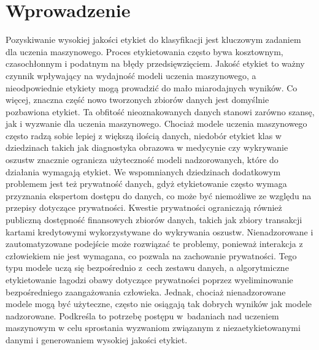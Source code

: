 \documentclass [runningheads]{llncs}
\begin{document}
\section*{Wprowadzenie}
Pozyskiwanie wysokiej jakości etykiet do klasyfikacji jest kluczowym zadaniem dla uczenia maszynowego.
Proces etykietowania często bywa kosztownym, czasochłonnym i podatnym na błędy przedsięwzięciem.
Jakość etykiet to ważny czynnik wpływający na wydajność modeli uczenia maszynowego, a nieodpowiednie etykiety mogą prowadzić do mało miarodajnych wyników.
Co więcej, znaczna część nowo tworzonych zbiorów danych jest domyślnie pozbawiona etykiet.
Ta obfitość nieoznakowanych danych stanowi zarówno szansę, jak i wyzwanie dla uczenia maszynowego.
Chociaż modele uczenia maszynowego często radzą sobie lepiej z większą ilością danych,
niedobór etykiet klas w dziedzinach takich jak diagnostyka obrazowa w medycynie\cite{article-deep-learning-medical}
czy wykrywanie oszustw znacznie ogranicza użyteczność modeli nadzorowanych, które do działania wymagają etykiet.
We wspomnianych dziedzinach dodatkowym problemem jest też prywatność danych, gdyż etykietowanie często wymaga
przyznania ekspertom dostępu do danych, co może być niemożliwe ze względu na przepisy dotyczące prywatności.
Kwestie prywatności ograniczają również publiczną dostępność finansowych zbiorów danych,
takich jak zbiory transakcji kartami kredytowymi wykorzystywane do wykrywania oszustw.
Nienadzorowane i zautomatyzowane podejście może rozwiązać te problemy,
ponieważ interakcja z człowiekiem nie jest wymagana, co pozwala na zachowanie prywatności.
Tego typu modele uczą się bezpośrednio z~cech zestawu danych, a algorytmiczne etykietowanie łagodzi obawy dotyczące
prywatności poprzez wyeliminowanie bezpośredniego zaangażowania człowieka.
Jednak, chociaż nienadzorowane modele mogą być użyteczne, często nie osiągają tak dobrych wyników jak modele nadzorowane.
Podkreśla to potrzebę postępu w~badaniach nad uczeniem maszynowym w celu sprostania wyzwaniom
związanym z niezaetykietowanymi danymi i generowaniem wysokiej jakości etykiet.
\end{document}
